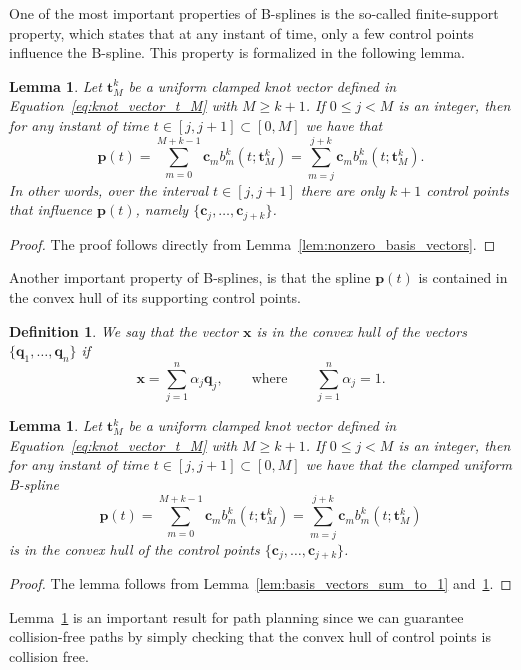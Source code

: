 \documentclass{article}
\newtheorem{lemma}[theorem]{Lemma}
\newtheorem{definition}[theorem]{Definition}
\newcommand{\cbf}{\mathbf{c}}
\newcommand{\xbf}{\mathbf{x}}
\begin{document}
One of the most important properties of B-splines is the so-called finite-support property, which states that at any instant of time, only a few control points influence the B-spline.  This property is formalized in the following lemma.
\begin{lemma}\label{lem:finite_num_control_points}
	Let $\mathbf{t}_M^k$ be a uniform clamped knot vector defined in Equation~\eqref{eq:knot_vector_t_M} with $M\geq k+1$. If $0\leq j < M$ is an integer, then for any instant of time $t\in[j, j+1]\subset [0, M]$ we have that
	\[
	\mathbf{p}(t) = \sum_{m=0}^{M+k-1} \cbf_m b_m^k(t; \mathbf{t}_M^k) = \sum_{m=j}^{j+k} \cbf_m b_m^k(t; \mathbf{t}_M^k).
	\]
	In other words, over the interval $t\in[j, j+1]$ there are only $k+1$ control points that influence $\mathbf{p}(t)$, namely
	$\{\cbf_j, \dots, \cbf_{j+k}\}$.
\end{lemma}
\begin{proof}
The proof follows directly from Lemma~\ref{lem:nonzero_basis_vectors}.	
\end{proof}



Another important property of B-splines, is that the spline $\mathbf{p}(t)$ is contained in the convex hull of its supporting control points.  
\begin{definition}
We say that the vector $\xbf$ is in the convex hull of the vectors $\{\mathbf{q}_1, \dots, \mathbf{q}_n\}$ if 
\[
\xbf = \sum_{j=1}^n \alpha_j \mathbf{q}_j, \qquad \text{where} \qquad \sum_{j=1}^n \alpha_j = 1.
\]	
\end{definition}

\begin{lemma}\label{lem:spline_in_convex_hull}
	Let $\mathbf{t}_M^k$ be a uniform clamped knot vector defined in Equation~\eqref{eq:knot_vector_t_M} with $M\geq k+1$. If $0\leq j < M$ is an integer, then for any instant of time $t\in[j, j+1]\subset [0, M]$ we have that the clamped uniform B-spline
	\[
	\mathbf{p}(t) = \sum_{m=0}^{M+k-1} \cbf_m b_m^k(t; \mathbf{t}_M^k) = \sum_{m=j}^{j+k} \cbf_m b_m^k(t; \mathbf{t}_M^k)
	\]
	is in the convex hull of the control points $\{\cbf_j, \dots, \cbf_{j+k}\}$.
\end{lemma}
\begin{proof}
	The lemma follows from Lemma~\ref{lem:basis_vectors_sum_to_1} and~\ref{lem:finite_num_control_points}.
\end{proof}
Lemma~\ref{lem:spline_in_convex_hull} is an important result for path planning since we can guarantee collision-free paths by simply checking that the convex hull of control points is collision free.
\end{document}
